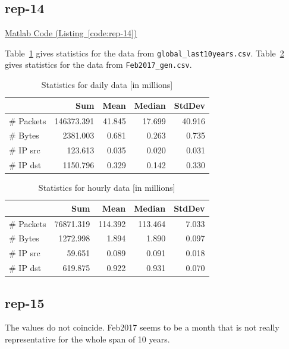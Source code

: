 \documentclass{article}
\newcommand{\codelink}[1]{%
    \hyperref[#1]{Matlab Code (Listing~\ref{#1})}%
}
\begin{document}
\subsection{rep-14}
\codelink{code:rep-14}

Table~\ref{table:rep-14-daily} gives statistics for the data from
\texttt{global\_last10years.csv}. Table~\ref{table:rep-14-hourly} gives
statistics for the data from \texttt{Feb2017\_gen.csv}.

\begin{table}[h]
    \centering
    \begin{tabular}{l|rrrr}
                & Sum & Mean & Median & StdDev \\
                \hline
        \# Packets &   146373.391 & 41.845 & 17.699 & 40.916 \\
        \# Bytes   &    2381.003 & 0.681 & 0.263 & 0.735 \\
        \# IP src     & 123.613 & 0.035 & 0.020 & 0.031 \\
        \# IP dst     & 1150.796 & 0.329 & 0.142 & 0.330 \\
    \end{tabular}
    \caption{\label{table:rep-14-daily} Statistics for daily data [in millions]}
\end{table}

\begin{table}[h]
    \centering
    \begin{tabular}{l|rrrr}
                & Sum & Mean & Median & StdDev \\
                \hline
        \# Packets &    76871.319 & 114.392 & 113.464 & 7.033 \\
        \# Bytes   &    1272.998  &1.894 & 1.890 & 0.097      \\
        \# IP src     & 59.651 & 0.089 & 0.091 & 0.018        \\
        \# IP dst     & 619.875 & 0.922 & 0.931 & 0.070       \\
    \end{tabular}
    \caption{\label{table:rep-14-hourly} Statistics for hourly data [in millions]}
\end{table}

\subsection{rep-15}

The values do not coincide. Feb2017 seems to be a month that is not really representative for the
whole span of 10 years.
\end{document}
